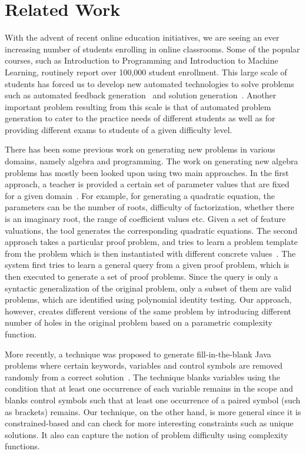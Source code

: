 \section{Related Work}

With the advent of recent online education initiatives, we are seeing
an ever increasing number of students enrolling in online
classrooms. Some of the popular courses, such as Introduction to
Programming and Introduction to Machine Learning, routinely report
over 100,000 student enrollment. This large scale of students has
forced us to develop new automated technologies to solve problems such
as automated feedback generation~\cite{autograder} and solution
generation~\cite{geometry}. Another important problem resulting
from this scale is that of automated problem generation to cater to
the practice needs of different students as well as for providing
different exams to students of a given difficulty level.

There has been some previous work on generating new problems in
various domains, namely algebra and programming. The work on
generating new algebra problems has mostly been looked upon using two
main approaches. In the first approach, a teacher is provided a
certain set of parameter values that are fixed for a given
domain~\cite{jurkovic}. For example, for generating a quadratic
equation, the parameters can be the number of roots, difficulty of
factorization, whether there is an imaginary root, the range of
coefficient values etc. Given a set of feature valuations, the tool
generates the corresponding quadratic equations. The second approach
takes a particular proof problem, and tries to learn a problem
template from the problem which is then instantiated with different
concrete values~\cite{algebra}. The system first tries to learn a
general query from a given proof problem, which is then executed to
generate a set of proof problems. Since the query is only a syntactic
generalization of the original problem, only a subset of them are
valid problems, which are identified using polynomial identity
testing. Our approach, however, creates different versions of the same
problem by introducing different number of holes in the original
problem based on a parametric complexity function.

More recently, a technique was proposed to generate fill-in-the-blank
Java problems where certain keywords, variables and control symbols
are removed randomly from a correct solution~\cite{javablanks}. The
technique blanks variables using the condition that at least one
occurrence of each variable remains in the scope and blanks control
symbols such that at least one occurrence of a paired symbol (such as
brackets) remains. Our technique, on the other hand, is more general
since it is constrained-based and can check for more interesting
constraints such as unique solutions. It also can capture the notion
of problem difficulty using complexity functions.
